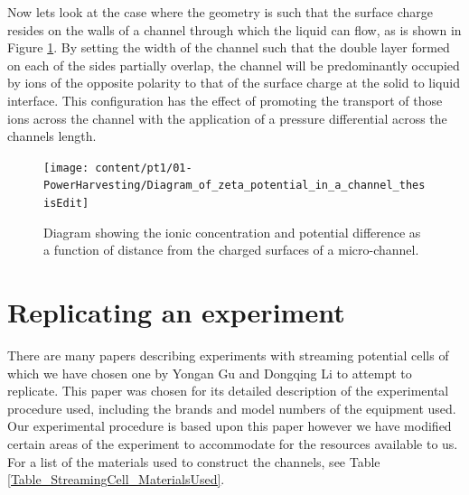 


Now lets look at the case where the geometry is such that the surface
charge resides on the walls of a channel through which the liquid
can flow, as is shown in Figure \ref{Figure_Diagram_ZetaPotential_and_in_a_channel}.
By setting the width of the channel such that the double layer formed
on each of the sides partially overlap, the channel will be predominantly
occupied by ions of the opposite polarity to that of the surface charge
at the solid to liquid interface. This configuration has the effect
of promoting the transport of those ions across the channel with the
application of a pressure differential across the channels length.

\begin{figure}
\centering{}\texttt{[image: content/pt1/01-PowerHarvesting/Diagram\_of\_zeta\_potential\_in\_a\_channel\_thesisEdit]}\protect\caption{\label{Figure_Diagram_ZetaPotential_and_in_a_channel}Diagram showing
the ionic concentration and potential difference as a function of
distance from the charged surfaces of a micro-channel.}
\end{figure}



\section{Replicating an experiment}

There are many papers describing experiments with streaming potential
cells \cite{Gu2000,Mala1997,Scales1992,VanderHeyden2006} of which
we have chosen one by Yongan Gu and Dongqing Li \cite{Gu2000} to
attempt to replicate. This paper was chosen for its detailed description
of the experimental procedure used, including the brands and model
numbers of the equipment used. Our experimental procedure is based
upon this paper however we have modified certain areas of the experiment
to accommodate for the resources available to us. For a list of the
materials used to construct the channels, see Table \ref{Table_StreamingCell_MaterialsUsed}.


